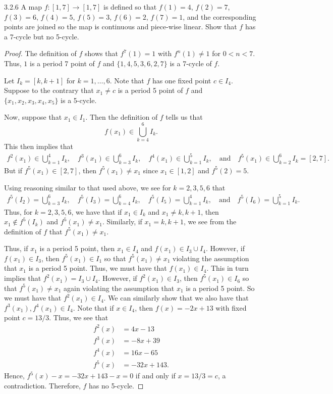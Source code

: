 \begin{problem}{3.2.6}
  A map $f : [1, 7] \to [1, 7]$ is defined so that $f (1) = 4$, $f(2) = 7$, $f(3) = 6$, $f(4) =
5$, $f(5) = 3$, $f(6) = 2$, $f(7) = 1$, and the corresponding points are joined so the map
is continuous and piece-wise linear. Show that $f$ has a 7-cycle but no 5-cycle.
\end{problem}

\begin{proof}
  The definition of $f$ shows that $f^7(1) = 1$ with $f^n(1) \neq 1$ for $0 < n < 7$.
  Thus, $1$ is a period 7 point of $f$ and $\{1, 4, 5, 3, 6, 2, 7\}$ is a 7-cycle of $f$.

  Let $I_k = [k, k+1]$ for $k=1,\dots,6$. Note that $f$ has one fixed point $c \in I_4$.
  Suppose to the contrary that $x_1\neq c$ is a period 5 point of $f$ and $\{x_1, x_2, x_3, x_4, x_5\}$ is a 5-cycle.

  Now, suppose that $x_1 \in I_1$. Then the definition of $f$ tells us that
  $$f(x_1) \in \bigcup_{k=4}^6 I_k.$$
  This then implies that
  \begin{align*}
    f^2(x_1) \in \bigcup_{k=1}^4 I_k, \quad
    f^3(x_1) \in \bigcup_{k=3}^6 I_k, \quad
    f^4(x_1) \in \bigcup_{k=1}^5 I_k, \quad\text{and}\quad
    f^5(x_1) \in \bigcup_{k=2}^6 I_k = [2,7].
  \end{align*}
  But if $f^5(x_1) \in [2,7]$, then $f^5(x_1) \neq x_1$ since $x_1 \in [1,2]$ and $f^5(2) = 5$.

  Using reasoning similar to that used above, we see for $k=2,3,5,6$ that
  \begin{align*}
    f^5(I_2) = \bigcup_{k=3}^6 I_k, \quad
    f^5(I_3) = \bigcup_{k=4}^6 I_k, \quad
    f^5(I_5) = \bigcup_{k=1}^4 I_k, \quad\text{and}\quad
    f^5(I_6) = \bigcup_{k=1}^5 I_k.
  \end{align*}
  Thus, for $k=2,3,5,6$, we have that if $x_1 \in I_k$ and $x_1\neq k,k+1$, then
  $x_1 \notin f^5(I_k)$ and $f^5(x_1) \neq x_1$. Similarly,
  if $x_1 = k, k+1$, we see from the definition of $f$ that $f^5(x_1) \neq x_1$.

  Thus, if $x_1$ is a period 5 point, then $x_1 \in I_4$ and $f(x_1) \in I_3 \cup I_4$.
  However, if $f(x_1) \in I_3$, then $f^5(x_1) \in I_1$ so that
  $f^5(x_1) \neq x_1$ violating the assumption that $x_1$ is a period 5 point.
  Thus, we must have that $f(x_1) \in I_4$. This in turn implies that $f^2(x_1) = I_3 \cup I_4$.
  However, if $f^2(x_1) \in I_3$, then $f^5(x_1) \in I_6$ so that
  $f^5(x_1) \neq x_1$ again violating the assumption that $x_1$ is a period 5 point.  So we must have that $f^2(x_1) \in I_4$.
  We can similarly show that we also have that $f^3(x_1), f^4(x_1) \in I_4$. Note
  that if $x \in I_4$, then $f(x) = -2x + 13$ with fixed point $c = 13/3$. Thus, we see that
  \begin{align*}
    f^2(x) &= 4x -13\\
    f^3(x) &= - 8 x + 39\\
    f^4(x) &= 16 x-65\\
    f^5(x) &=  - 32 x + 143.
  \end{align*}
  Hence, $f^5(x) - x = -32x + 143 - x = 0$ if and only if $x=13/3 = c$, a contradiction. Therefore, $f$ has no 5-cycle.
\end{proof}
\newpage
